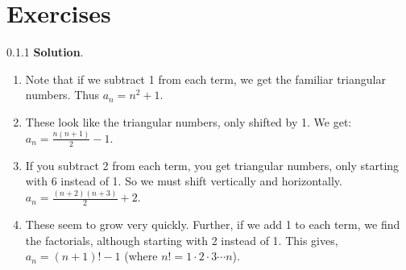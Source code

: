 \documentclass[11pt,]{book}
\theoremstyle{ptxplainnotitle}
\theoremstyle{ptxplaintitle}
\theoremstyle{ptxdefinitionnotitle}
\theoremstyle{ptxdefinitiontitle}
\theoremstyle{ptxdefinitionnotitle}
\theoremstyle{ptxdefinitiontitle}
\theoremstyle{ptxdefinitionnotitle}
\theoremstyle{ptxdefinitiontitle}
\theoremstyle{ptxdefinitiontitlenonumber}
\theoremstyle{ptxdefinitiontitlenonumber}
\numberwithin{equation}{chapter}
\begin{document}
\section*{Exercises}
\begin{divisionexercise}{0.1.1}
\textbf{Solution}.\quad%
\hypertarget{p-90}{}%
\leavevmode%
\begin{enumerate}[label=\alph*.]
\item\hypertarget{li-62}{}\hypertarget{p-91}{}%
Note that if we subtract 1 from each term, we get the familiar triangular numbers.  Thus \(a_n = n^2 + 1\text{.}\)%
\item\hypertarget{li-63}{}\hypertarget{p-92}{}%
These look like the triangular numbers, only shifted by 1.  We get: \(a_n = \frac{n(n+1)}{2} - 1\text{.}\)%
\item\hypertarget{li-64}{}\hypertarget{p-93}{}%
If you subtract 2 from each term, you get triangular numbers, only starting with 6 instead of 1.  So we must shift vertically and horizontally.  \(a_n = \frac{(n+2)(n+3)}{2} + 2\text{.}\)%
\item\hypertarget{li-65}{}\hypertarget{p-94}{}%
These seem to grow very quickly.  Further, if we add 1 to each term, we find the factorials, although starting with 2 instead of 1.  This gives, \(a_n = (n+1)! - 1\) (where \(n! = 1 \cdot 2 \cdot 3 \cdots n\)).%
\end{enumerate}
%
\end{divisionexercise}%
\end{document}
